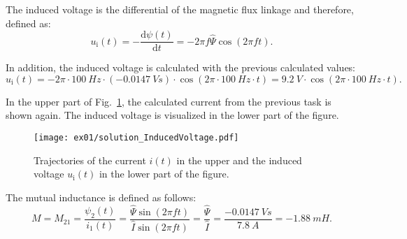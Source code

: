 
\begin{solutionblock}
    The induced voltage is the differential of the magnetic flux linkage and therefore, defined as:
    \begin{equation}
        u_{\mathrm{i}}(t) = -\frac{\mathrm{d}\psi(t)}{\mathrm{d}t}
        = - 2 \pi f \mathit{\hat{\Psi}} \cos(2 \pi f t).
    \end{equation}

    In addition, the induced voltage is calculated with the previous calculated values:
    \begin{equation}
        u_{\mathrm{i}}(t) = -2 \pi \cdot 100 \ \si{Hz} \cdot (-0.0147 \ \si{Vs}) \cdot \cos(2 \pi \cdot 100 \ \si{Hz} \cdot t)
        = 9.2 \ \si{V} \cdot \cos(2 \pi \cdot 100 \ \si{Hz} \cdot t).
    \end{equation}

    In the upper part of Fig.~\ref{fig:solution_InducedVoltage}, the calculated current from the previous task is shown again. The induced voltage is visualized in the lower part of the figure. 
    \begin{figure}[ht]
        \centering
        \texttt{[image: ex01/solution\_InducedVoltage.pdf]}
        \caption{Trajectories of the current $i(t)$ in the upper and the induced voltage $u_{\mathrm{i}}(t)$ in the lower part of the figure.}
        \label{fig:solution_InducedVoltage}
    \end{figure}
    
\end{solutionblock}




\begin{solutionblock}
   The mutual inductance is defined as follows:
    \begin{equation}
        M = M_{\mathrm{21}} = \frac{\psi_{\mathrm{2}}(t)}{i_{\mathrm{1}}(t)}
        = \frac{\mathit{\hat{\Psi}} \sin(2 \pi f t)}{\hat{I} \sin(2 \pi f t)}
        = \frac{\mathit{\hat{\Psi}}}{\hat{I}}
        = \frac{-0.0147 \ \si{Vs}}{7.8 \ \si{A}}
        = -1.88 \ \si{mH}.
    \end{equation}

\end{solutionblock}





